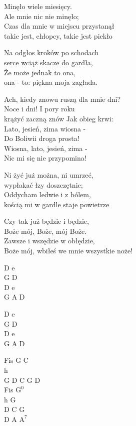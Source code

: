 \begin{text}
    Minęło wiele miesięcy.\\
    Ale mnie nic nie minęło;\\
    Czas dla mnie w miejscu przystanął\\
    takie jest, chłopcy, takie jest piekło

    Na odgłos kroków po schodach\\
    serce wciąż skacze do gardła,\\
    Że może jednak to ona,\\
    ona - to: piękna moja zagłada.

    \vin Ach, kiedy znowu ruszą dla mnie dni?\\
    \vin Noce i dni! I pory roku\\
    \vin krążyć zaczną znów Jak obieg krwi:\\
    \vin Lato, jesień, zima wiosna -\\
    \vin Do Boliwii droga prosta!\\
    \vin Wiosna, lato, jesień, zima -\\
    \vin Nic mi się nie przypomina!

    Ni żyć już można, ni umrzeć,\\
    wypłakać łzy doszczętnie;\\
    Oddycham ledwie i z bólem,\\
    kością mi w gardle staje powietrze

    Czy tak już będzie i będzie,\\
    Boże mój, Boże, mój Boże.\\
    Zawsze i wszędzie w obłędzie,\\
    Boże mój, wbiłeś we mnie wszystkie noże!
\end{text}
\begin{chord}
    D e\\
    G D\\
    D e\\
    G A D

    D e\\
    G D\\
    D e\\
    G A D

    Fis G C\\
    h\\
    G D C G D\\
    Fis $\mathrm{G^{0}}$\\
    h G\\
    D C G\\
    D A $\mathrm{A^{7}}$
\end{chord}
